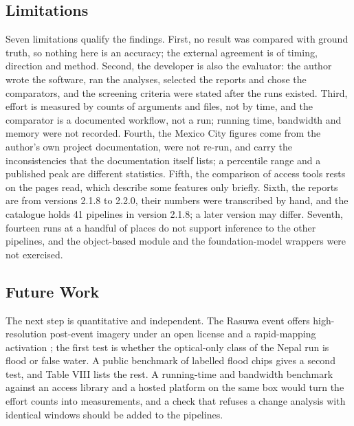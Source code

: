 \documentclass[conference]{IEEEtran}
\begin{document}
\subsection{Limitations}

Seven limitations qualify the findings. First, no result was compared with ground truth, so nothing here is an accuracy; the external agreement is of timing, direction and method. Second, the developer is also the evaluator: the author wrote the software, ran the analyses, selected the reports and chose the comparators, and the screening criteria were stated after the runs existed. Third, effort is measured by counts of arguments and files, not by time, and the comparator is a documented workflow, not a run; running time, bandwidth and memory were not recorded. Fourth, the Mexico City figures come from the author's own project documentation, were not re-run, and carry the inconsistencies that the documentation itself lists; a percentile range and a published peak are different statistics. Fifth, the comparison of access tools rests on the pages read, which describe some features only briefly. Sixth, the reports are from versions 2.1.8 to 2.2.0, their numbers were transcribed by hand, and the catalogue holds 41 pipelines in version 2.1.8; a later version may differ. Seventh, fourteen runs at a handful of places do not support inference to the other pipelines, and the object-based module and the foundation-model wrappers were not exercised.

\subsection{Future Work}

The next step is quantitative and independent. The Rasuwa event offers high-resolution post-event imagery under an open license \cite{roy2026nepalfloods} and a rapid-mapping activation \cite{cems2026emsr927}; the first test is whether the optical-only class of the Nepal run is flood or false water. A public benchmark of labelled flood chips \cite{bonafilia2020sen1floods11} gives a second test, and Table VIII lists the rest. A running-time and bandwidth benchmark against an access library and a hosted platform on the same box would turn the effort counts into measurements, and a check that refuses a change analysis with identical windows should be added to the pipelines.
\end{document}
